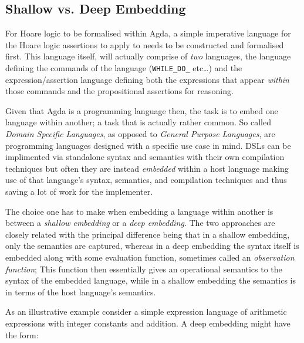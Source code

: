 \documentclass[oneside,12pt]{article}
\newcommand{\impcode}[1]{\textsc{\texttt{#1}}}
\begin{document}
\subsection{Shallow vs. Deep Embedding}
\label{sec:shallowdeep}


For Hoare logic to be formalised within Agda, a simple imperative language for the Hoare logic assertions to apply to needs to be constructed and formalised first. This language itself, will actually comprise of \emph{two} languages, the language defining the commands of the language (\impcode{WHILE\_DO\_} etc\ldots) and the expression/assertion language defining both the expressions that appear \emph{within} those commands and the propositional assertions for reasoning.


Given that Agda is a programming language then, the task is to embed one language within another; a task that is actually rather common. So called \emph{Domain Specific Languages}, as opposed to \emph{General Purpose Languages}, are programming languages designed with a specific use case in mind. DSLs can be implimented via standalone syntax and semantics with their own compilation techniques but often they are instead \emph{embedded} within a host language making use of that language's syntax, semantics, and compilation techniques and thus saving a lot of work for the implementer.

The choice one has to make when embedding a language within another is between a \emph{shallow embedding} or a \emph{deep embedding}. The two approaches are closely related with the principal difference being that in a shallow embedding, only the semantics are captured, whereas in a deep embedding the syntax itself is embedded along with some evaluation function, sometimes called an \emph{observation function}; This function then essentially gives an operational semantics to the syntax of the embedded language, while in a shallow embedding the semantics is in terms of the host language's semantics.


As an illustrative example consider a simple expression language of arithmetic expressions with integer constants and addition. A deep embedding might have the form:
\end{document}
